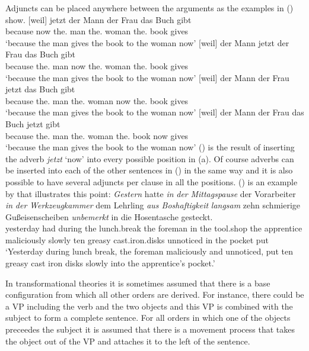 Adjuncts can be placed anywhere between the arguments as the examples in () show.
\eal
\ex
\gll {}[weil] jetzt der Mann der Frau das Buch gibt\\
     {}\spacebr{}because now the.\nom{} man the.\dat{} woman the.\acc{} book gives\\
\glt `because the man gives the book to the woman now'
\ex
\gll {}[weil] der Mann jetzt der Frau das Buch gibt\\
     {}\spacebr{}because the.\nom{} man now the.\dat{} woman the.\acc{} book gives\\
\glt `because the man gives the book to the woman now'
\ex
\gll {}[weil] der Mann der Frau jetzt das Buch gibt\\
     {}\spacebr{}because the.\nom{} man the.\dat{} woman now the.\acc{} book gives\\
\glt `because the man gives the book to the woman now'
\ex
\gll {}[weil] der Mann der Frau das Buch jetzt gibt\\
     {}\spacebr{}because the.\nom{} man the.\dat{} woman the.\acc{} book now gives\\
\glt `because the man gives the book to the woman now'
\zl
() is the result of inserting the adverb \emph{jetzt} `now' into every possible position in
(a). Of course adverbs can be inserted into each of the other sentences in () in the
same way and it is also possible to have several adjuncts per clause in all the positions. ()
is an example by \citet[]{Uszkoreit87a} that illustrates this point:
\ea
\gll \emph{Gestern} hatte \emph{in} \emph{der} \emph{Mittagspause} der Vorarbeiter \emph{in} \emph{der} \emph{Werkzeugkammer} dem Lehrling \emph{aus
Boshaftigkeit} \emph{langsam} zehn schmierige Gußeisenscheiben \emph{unbemerkt} in die Hosentasche gesteckt. \\
yesterday had during the lunch.break the foreman in the tool.shop the apprentice maliciously slowly ten
greasy cast.iron.disks unnoticed in the pocket put\\
\glt `Yesterday during lunch break, the foreman maliciously and
unnoticed, put ten greasy cast iron disks slowly into the
apprentice's pocket.'
\z

In transformational theories it is sometimes assumed that there is a base configuration from which
all other orders are derived. For instance, there could be a VP including the verb and the two
objects and this VP is combined with the subject to form a complete sentence. For all orders in
which one of the objects preceedes the subject it is assumed that there is a movement process that
takes the object out of the VP and attaches it to the left of the sentence.

